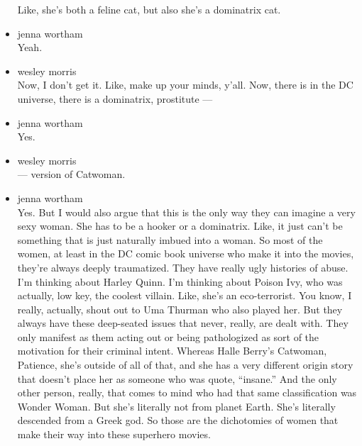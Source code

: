 \begin{itemize}
  Like, she's both a feline cat, but also she's a dominatrix cat.
\item
  jenna wortham\\
  Yeah.
\item
  wesley morris\\
  Now, I don't get it. Like, make up your minds, y'all. Now, there is in
  the DC universe, there is a dominatrix, prostitute ---
\item
  jenna wortham\\
  Yes.
\item
  wesley morris\\
  --- version of Catwoman.
\item
  jenna wortham\\
  Yes. But I would also argue that this is the only way they can imagine
  a very sexy woman. She has to be a hooker or a dominatrix. Like, it
  just can't be something that is just naturally imbued into a woman. So
  most of the women, at least in the DC comic book universe who make it
  into the movies, they're always deeply traumatized. They have really
  ugly histories of abuse. I'm thinking about Harley Quinn. I'm thinking
  about Poison Ivy, who was actually, low key, the coolest villain.
  Like, she's an eco-terrorist. You know, I really, actually, shout out
  to Uma Thurman who also played her. But they always have these
  deep-seated issues that never, really, are dealt with. They only
  manifest as them acting out or being pathologized as sort of the
  motivation for their criminal intent. Whereas Halle Berry's Catwoman,
  Patience, she's outside of all of that, and she has a very different
  origin story that doesn't place her as someone who was quote,
  ``insane.'' And the only other person, really, that comes to mind who
  had that same classification was Wonder Woman. But she's literally not
  from planet Earth. She's literally descended from a Greek god. So
  those are the dichotomies of women that make their way into these
  superhero movies.


\end{itemize}
